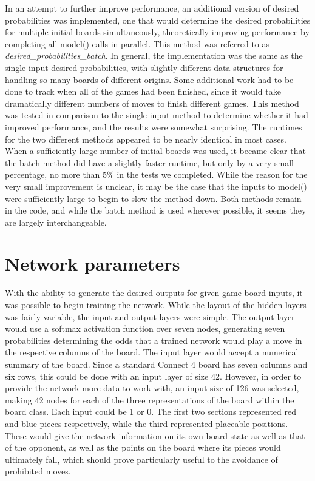 \documentclass[12pt]{article}
\begin{document}
In an attempt to further improve performance, an additional version of desired probabilities was implemented, one that would determine the desired probabilities for multiple initial boards simultaneously, theoretically improving performance by completing all model() calls in parallel. This method was referred to as \textit{desired\_probabilities\_batch}. In general, the implementation was the same as the single-input desired probabilities, with slightly different data structures for handling so many boards of different origins. Some additional work had to be done to track when all of the games had been finished, since it would take dramatically different numbers of moves to finish different games. This method was tested in comparison to the single-input method to determine whether it had improved performance, and the results were somewhat surprising. The runtimes for the two different methods appeared to be nearly identical in most cases. When a sufficiently large number of initial boards was used, it became clear that the batch method did have a slightly faster runtime, but only by a very small percentage, no more than 5\% in the tests we completed. While the reason for the very small improvement is unclear, it may be the case that the inputs to model() were sufficiently large to begin to slow the method down. Both methods remain in the code, and while the batch method is used wherever possible, it seems they are largely interchangeable.

\section{Network parameters}
With the ability to generate the desired outputs for given game board inputs, it was possible to begin training the network. While the layout of the hidden layers was fairly variable, the input and output layers were simple. The output layer would use a softmax activation function over seven nodes, generating seven probabilities determining the odds that a trained network would play a move in the respective columns of the board. The input layer would accept a numerical summary of the board. Since a standard Connect 4 board has seven columns and six rows, this could be done with an input layer of size 42. However, in order to provide the network more data to work with, an input size of 126 was selected, making 42 nodes for each of the three representations of the board within the board class. Each input could be 1 or 0. The first two sections represented red and blue pieces respectively, while the third represented placeable positions. These would give the network information on its own board state as well as that of the opponent, as well as the points on the board where its pieces would ultimately fall, which should prove particularly useful to the avoidance of prohibited moves.
\end{document}
